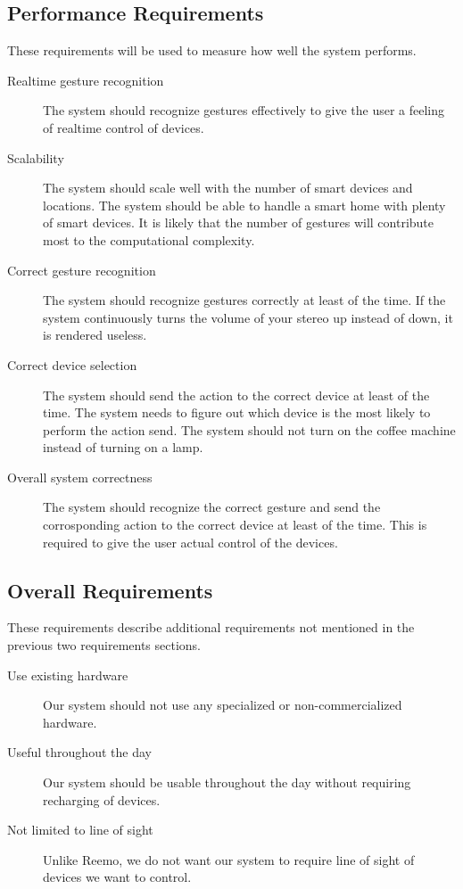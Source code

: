 \subsection{Performance Requirements}
These requirements will be used to measure how well the system performs. 
\begin{description}
    \item[Realtime gesture recognition] The system should recognize gestures effectively to give the user a feeling of realtime control of devices. %
    \item[Scalability] The system should scale well with the number of smart devices and locations. The system should be able to handle a smart home with plenty of smart devices. It is likely that the number of gestures will contribute most to the computational complexity. %
    \item[Correct gesture recognition] The system should recognize gestures correctly at least  of the time. If the system continuously turns the volume of your stereo up instead of down, it is rendered useless.  
    \item[Correct device selection] The system should send the action to the correct device at least  of the time. The system needs to figure out which device is the most likely to perform the action send. The system should not turn on the coffee machine instead of turning on a lamp. 
    \item[Overall system correctness] The system should recognize the correct gesture and send the corrosponding action to the correct device at least  of the time. This is required to give the user actual control of the devices. 
\end{description}
    
\subsection{Overall Requirements}
These requirements describe additional requirements not mentioned in the previous two requirements sections.
\begin{description}
    \item[Use existing hardware] Our system should not use any specialized or non-commercialized hardware.  
    \item[Useful throughout the day] Our system should be usable throughout the day without requiring recharging of devices. 
    \item[Not limited to line of sight] Unlike Reemo, we do not want our system to require line of sight of devices we want to control. 
\end{description}
